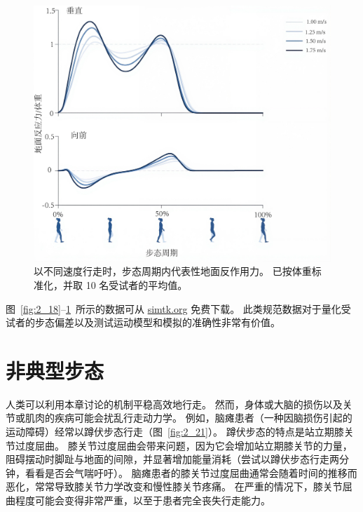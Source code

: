 \begin{figure}[!htb]
	\centering
	\includegraphics[width=0.95\linewidth]{chap2/2_20}
	\caption{以不同速度行走时，步态周期内代表性地面反作用力。
		已按体重标准化，并取 10 名受试者的平均值\cite{arnold2013muscle}。 \label{fig:2_20}}
\end{figure}


图~\ref{fig:2_18}–\ref{fig:2_20}~所示的数据可从 \href{simtk.org}{simtk.org} 免费下载。
此类规范数据对于量化受试者的步态偏差以及测试运动模型和模拟的准确性非常有价值。


\section{非典型步态}

人类可以利用本章讨论的机制平稳高效地行走。
然而，身体或大脑的损伤以及关节或肌肉的疾病可能会扰乱行走动力学。
例如，脑瘫患者（一种因脑损伤引起的运动障碍）经常以蹲伏步态行走（图~\ref{fig:2_21}）。
蹲伏步态的特点是站立期膝关节过度屈曲。
膝关节过度屈曲会带来问题，因为它会增加站立期膝关节的力量，阻碍摆动时脚趾与地面的间隙，并显著增加能量消耗（尝试以蹲伏步态行走两分钟，看看是否会气喘吁吁）。
脑瘫患者的膝关节过度屈曲通常会随着时间的推移而恶化，常常导致膝关节力学改变和慢性膝关节疼痛。
在严重的情况下，膝关节屈曲程度可能会变得非常严重，以至于患者完全丧失行走能力。


